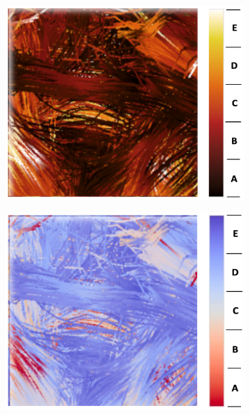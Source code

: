 \documentclass[hyperref, plainreport, noproblem]{cgvpub1}
\begin{document}
\begin{itemize}
\begin{figure}[ht]
    \centering
    \begin{subfigure}[b]{0.45\textwidth}
    	\includegraphics[width =  \columnwidth]{blackbody-fa}
	\caption{ }
    \end{subfigure}
    \hspace{0.3cm}
    \begin{subfigure}[b]{0.45\textwidth}
    	\includegraphics[width =  \columnwidth]{coolwarm-fa}
	\caption{ }
    \end{subfigure}	
    \begin{subfigure}[b]{0.45\textwidth}

\end{subfigure}
\end{figure}
\end{itemize}
\end{document}
